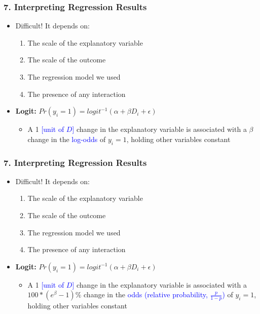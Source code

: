 \documentclass[xcolor=x11names,compress]{beamer}\usepackage[]{graphicx}\usepackage[]{color}
\renewcommand{\(}{\begin{columns}}
\renewcommand{\)}{\end{columns}}
\newcommand{\<}[1]{\begin{column}{#1}}
\renewcommand{\>}{\end{column}}
\begin{document}
\begin{frame}
\frametitle{7. Interpreting Regression Results}
\begin{itemize}
\item Difficult! It depends on:
\begin{enumerate}
\item The scale of the explanatory variable
\item The scale of the outcome
\item The regression model we used
\item The presence of any interaction
\end{enumerate}
\item \textbf{Logit:} $Pr(y_i=1) = logit^{-1} (\alpha + \beta D_i + \epsilon)$
\begin{itemize}
\item A 1 \textcolor{blue}{[unit of $D$]} change in the explanatory variable is associated with a $\beta$ change in the \textcolor{blue}{log-odds} of $y_i=1$, holding other variables constant
\end{itemize}
\end{itemize}
\end{frame}

\begin{frame}
\frametitle{7. Interpreting Regression Results}
\begin{itemize}
\item Difficult! It depends on:
\begin{enumerate}
\item The scale of the explanatory variable
\item The scale of the outcome
\item The regression model we used
\item The presence of any interaction
\end{enumerate}
\item \textbf{Logit:} $Pr(y_i=1) = logit^{-1} (\alpha + \beta D_i + \epsilon)$
\begin{itemize}
\item A 1 \textcolor{blue}{[unit of $D$]} change in the explanatory variable is associated with a $100*(e^{\beta}-1)\%$ change in the \textcolor{blue}{odds (relative probability, $\frac{p}{1-p}$)} of $y_i=1$, holding other variables constant
\end{itemize}
\end{itemize}
\end{frame}
\end{document}
